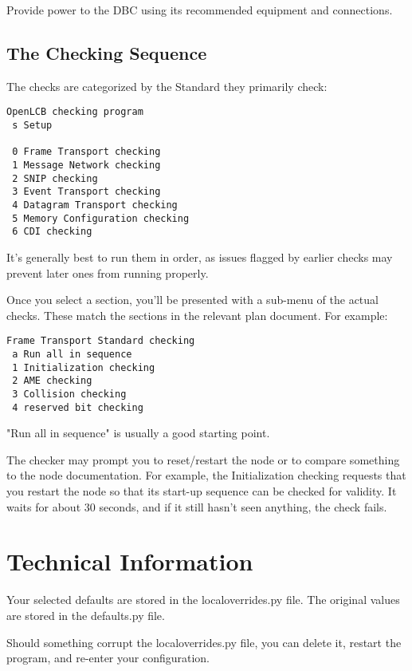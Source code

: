 Provide power to the DBC using its recommended equipment and connections.

\subsection{The Checking Sequence}

The checks are categorized by the Standard they primarily check:

\begin{verbatim}
OpenLCB checking program
 s Setup

 0 Frame Transport checking
 1 Message Network checking
 2 SNIP checking
 3 Event Transport checking
 4 Datagram Transport checking
 5 Memory Configuration checking
 6 CDI checking
\end{verbatim}

It's generally best to run them in order, as issues flagged by earlier
checks may prevent later ones from running properly.

Once you select a section, you'll be presented with a sub-menu of the
actual checks.  These match the sections in the relevant plan document.
For example:

\begin{verbatim}
Frame Transport Standard checking
 a Run all in sequence
 1 Initialization checking
 2 AME checking
 3 Collision checking
 4 reserved bit checking
\end{verbatim}

"Run all in sequence" is usually a good starting point.

The checker may prompt you to reset/restart the node or to 
compare something to the node documentation. For example, 
the Initialization checking requests that you restart the node
so that its start-up sequence can be checked for validity.
It waits for about 30 seconds, and if it still hasn't seen anything, the
check fails.

\section{Technical Information}

Your selected defaults are stored in the localoverrides.py file.
The original values are stored in the defaults.py file.

Should something corrupt the localoverrides.py file,
you can delete it, restart the program, and re-enter your configuration.

